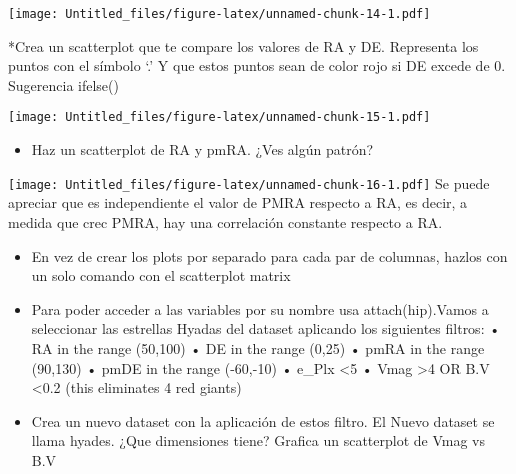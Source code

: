 \documentclass[]{article}
\newenvironment{Shaded}{\begin{snugshade}}{\end{snugshade}}
\newcommand{\KeywordTok}[1]{\textcolor[rgb]{0.13,0.29,0.53}{\textbf{#1}}}
\newcommand{\DataTypeTok}[1]{\textcolor[rgb]{0.13,0.29,0.53}{#1}}
\newcommand{\DecValTok}[1]{\textcolor[rgb]{0.00,0.00,0.81}{#1}}
\newcommand{\StringTok}[1]{\textcolor[rgb]{0.31,0.60,0.02}{#1}}
\newcommand{\OperatorTok}[1]{\textcolor[rgb]{0.81,0.36,0.00}{\textbf{#1}}}
\newcommand{\NormalTok}[1]{#1}
\providecommand{\tightlist}{%
  \setlength{\itemsep}{0pt}\setlength{\parskip}{0pt}}
\begin{document}
\texttt{[image: Untitled\_files/figure-latex/unnamed-chunk-14-1.pdf]}

*Crea un scatterplot que te compare los valores de RA y DE. Representa
los puntos con el símbolo `.' Y que estos puntos sean de color rojo si
DE excede de 0. Sugerencia ifelse()

\begin{Shaded}
\end{Shaded}

\texttt{[image: Untitled\_files/figure-latex/unnamed-chunk-15-1.pdf]}

\begin{itemize}
\tightlist
\item
  Haz un scatterplot de RA y pmRA. ¿Ves algún patrón?
\end{itemize}

\begin{Shaded}
\end{Shaded}

\texttt{[image: Untitled\_files/figure-latex/unnamed-chunk-16-1.pdf]} Se
puede apreciar que es independiente el valor de PMRA respecto a RA, es
decir, a medida que crec PMRA, hay una correlación constante respecto a
RA.

\begin{itemize}
\item
  En vez de crear los plots por separado para cada par de columnas,
  hazlos con un solo comando con el scatterplot matrix
\item
  Para poder acceder a las variables por su nombre usa attach(hip).Vamos
  a seleccionar las estrellas Hyadas del dataset aplicando los
  siguientes filtros: • RA in the range (50,100) • DE in the range
  (0,25) • pmRA in the range (90,130) • pmDE in the range (-60,-10) •
  e\_Plx \textless{}5 • Vmag \textgreater{}4 OR B.V \textless{}0.2 (this
  eliminates 4 red giants)
\item
  Crea un nuevo dataset con la aplicación de estos filtro. El Nuevo
  dataset se llama hyades. ¿Que dimensiones tiene? Grafica un
  scatterplot de Vmag vs B.V
\end{itemize}
\end{document}
